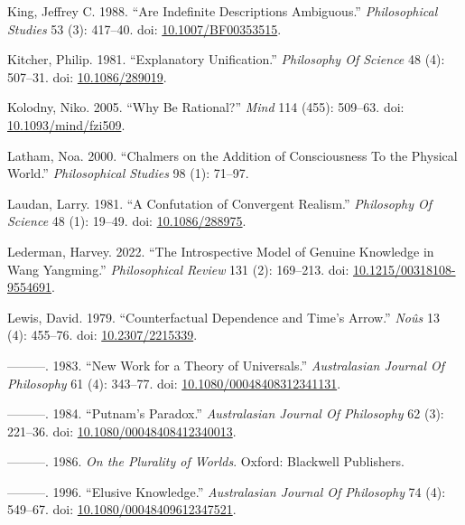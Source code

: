 \documentclass[
  10pt,
  letterpaper,
  DIV=11,
  numbers=noendperiod,
  twoside]{scrartcl}
\newlength{\cslhangindent}
\newenvironment{CSLReferences}[2] %
 {\begin{list}{}{%
  \setlength{\itemindent}{0pt}
  \setlength{\leftmargin}{0pt}
  \setlength{\parsep}{0pt}
  \ifodd #1
   \setlength{\leftmargin}{\cslhangindent}
   \setlength{\itemindent}{-1\cslhangindent}
  \fi
  \setlength{\itemsep}{#2\baselineskip}}}
 {\end{list}}
\begin{document}
\begin{CSLReferences}{1}{0}
King, Jeffrey C. 1988. {``Are Indefinite Descriptions Ambiguous.''}
\emph{Philosophical Studies} 53 (3): 417--40. doi:
\href{https://doi.org/10.1007/BF00353515}{10.1007/BF00353515}.

Kitcher, Philip. 1981. {``Explanatory Unification.''} \emph{Philosophy
Of Science} 48 (4): 507--31. doi:
\href{https://doi.org/10.1086/289019}{10.1086/289019}.

Kolodny, Niko. 2005. {``Why Be Rational?''} \emph{Mind} 114 (455):
509--63. doi:
\href{https://doi.org/10.1093/mind/fzi509}{10.1093/mind/fzi509}.

Latham, Noa. 2000. {``Chalmers on the Addition of Consciousness To the
Physical World.''} \emph{Philosophical Studies} 98 (1): 71--97.

Laudan, Larry. 1981. {``A Confutation of Convergent Realism.''}
\emph{Philosophy Of Science} 48 (1): 19--49. doi:
\href{https://doi.org/10.1086/288975}{10.1086/288975}.

Lederman, Harvey. 2022. {``The Introspective Model of Genuine Knowledge
in Wang Yangming.''} \emph{Philosophical Review} 131 (2): 169--213. doi:
\href{https://doi.org/10.1215/00318108-9554691}{10.1215/00318108-9554691}.

Lewis, David. 1979. {``Counterfactual Dependence and Time's Arrow.''}
\emph{Noûs} 13 (4): 455--76. doi:
\href{https://doi.org/10.2307/2215339}{10.2307/2215339}.

---------. 1983. {``New Work for a Theory of Universals.''}
\emph{Australasian Journal Of Philosophy} 61 (4): 343--77. doi:
\href{https://doi.org/10.1080/00048408312341131}{10.1080/00048408312341131}.

---------. 1984. {``Putnam's Paradox.''} \emph{Australasian Journal Of
Philosophy} 62 (3): 221--36. doi:
\href{https://doi.org/10.1080/00048408412340013}{10.1080/00048408412340013}.

---------. 1986. \emph{On the Plurality of Worlds}. Oxford: Blackwell
Publishers.

---------. 1996. {``Elusive Knowledge.''} \emph{Australasian Journal Of
Philosophy} 74 (4): 549--67. doi:
\href{https://doi.org/10.1080/00048409612347521}{10.1080/00048409612347521}.


\end{CSLReferences}
\end{document}
